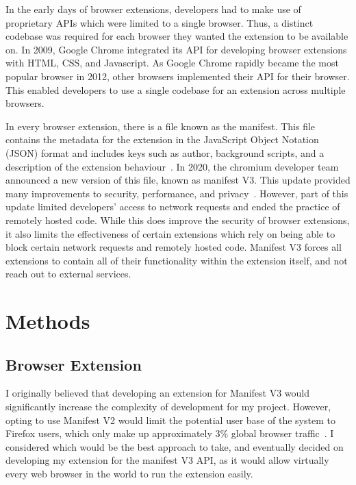 \documentclass[twocolumn]{report}
\begin{document}
In the early days of browser extensions, developers had to make use of proprietary APIs which were limited to a single browser. Thus, a distinct codebase was required for each browser they wanted the extension to be available on. In 2009, Google Chrome integrated its API for developing browser extensions with HTML, CSS, and Javascript. As Google Chrome rapidly became the most popular browser in 2012, other browsers implemented their API for their browser. This enabled developers to use a single codebase for an extension across multiple browsers. 

In every browser extension, there is a file known as the manifest. This file contains the metadata for the extension in the JavaScript Object Notation (JSON) format and includes keys such as author, background scripts, and a description of the extension behaviour~\cite{bengtsson2020manifest}. In 2020, the chromium developer team announced a new version of this file, known as manifest V3. This update provided many improvements to security, performance, and privacy~\cite{li2020manifest}. However, part of this update limited developers' access to network requests and ended the practice of remotely hosted code. While this does improve the security of browser extensions, it also limits the effectiveness of certain extensions which rely on being able to block certain network requests and remotely hosted code. Manifest V3 forces all extensions to contain all of their functionality within the extension itself, and not reach out to external services. 



\chapter{Methods}
\label{chap:methods}


\section{Browser Extension}

I originally believed that developing an extension for Manifest V3 would significantly increase the complexity of development for my project. However, opting to use Manifest V2 would limit the potential user base of the system to Firefox users, which only make up approximately 3\% global browser traffic~\cite{statcounter2024browser}. I considered which would be the best approach to take, and eventually decided on developing my extension for the manifest V3 API, as it would allow virtually every web browser in the world to run the extension easily.
\end{document}
